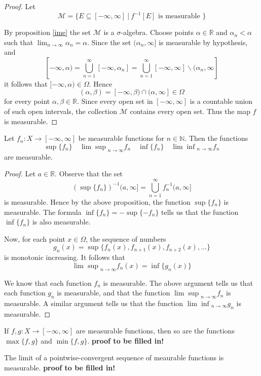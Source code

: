 \begin{proof}
Let
$${\mathcal M} = \{ E\subseteq [-\infty ,\infty]\ |\ f^{-1}[E] \textrm{ is measurable } \}$$

By proposition \ref{ime} the set $\mathcal M$ is a $\sigma$-algebra.  Choose points $\alpha \in {\mathbb R}$ and $\alpha_n < \alpha$ such that $\lim_{n\rightarrow \infty} \alpha_n = \alpha$.  Since the set $(\alpha_n , \infty ]$ is measurable by hypothesis, and
$$[-\infty , \alpha ) = \bigcup_{n=1}^\infty [-\infty , \alpha_n ] = \bigcup_{n=1}^\infty [-\infty , \infty ]\backslash (\alpha_n , \infty]$$
it follows that $[-\infty , \alpha )\in \Omega$.  Hence
$$(\alpha , \beta ) = [-\infty , \beta ) \cap (\alpha , \infty ] \in \Omega$$
for every point $\alpha , \beta \in {\mathbb R}$.  Since every open set in $[-\infty , \infty ]$ is a countable union of such open intervals, the collection $\mathcal M$ contains every open set.  Thus the map $f$ is measurable.
\end{proof}

\begin{corollary}
Let $f_n\colon X\rightarrow [-\infty , \infty]$ be measurable functions for $n\in {\mathbb N}$.  Then the functions
$$\sup \{ f_n \} \quad {\lim \sup}_{n\rightarrow \infty} f_n \quad \inf \{ f_n \} \quad {\lim \inf}_{n\rightarrow \infty} f_n$$
are measurable.
\end{corollary} 

\begin{proof}
Let $a\in {\mathbb R}$.  Observe that the set
$$(\sup \{ f_n \})^{-1} (a,\infty ] = \bigcup_{n=1}^\infty f_n^{-1}(a,\infty ]$$
is measurable.  Hence by the above proposition, the function $\sup \{ f_n \}$ is measurable.  The formula $\inf \{ f_n \} = - \sup \{ -f_n \}$ tells us that the function $\inf \{ f_n \}$ is also measurable.

Now, for each point $x\in \Omega$, the sequence of numbers
$$g_n (x) = \sup \{ f_n (x) , f_{n+1} (x) , f_{n+2}(x) , \ldots \}$$
is monotonic increasing.  It follows that
$${\lim \sup }_{n\rightarrow \infty} f_n (x) = \inf \{ g_n (x) \}$$

We know that each function $f_n$ is measurable.  The above argument tells us that each function $g_n$ is measurable, and that the function ${\lim \sup}_{n\rightarrow \infty}f_n$ is measurable.  A similar argument tells us that the function ${\lim \inf}_{n\rightarrow \infty}g_n$ is measurable.
\end{proof}


\begin{corollary}
If $f,g\colon X\rightarrow [-\infty, \infty ]$ are measurable functions, then so are the functions $\max \{ f,g \}$ and $\min \{ f,g \}$.
\textbf{proof to be filled in!}
\end{corollary}

\begin{corollary}
The limit of a pointwise-convergent sequence of meaurable functions is measurable.
\textbf{proof to be filled in!}
\end{corollary}
